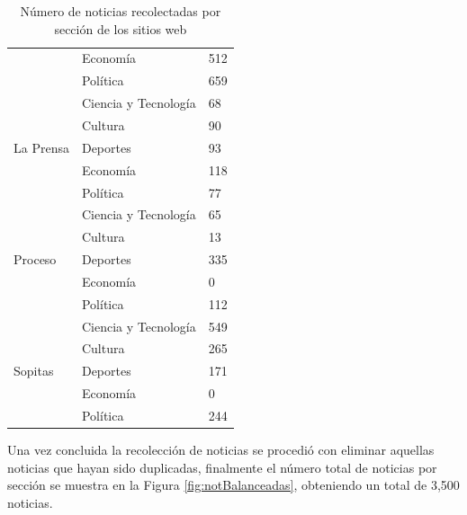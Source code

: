 \begin{table}[H]
\begin{tabular}{|l|l|l|}
                                    & Economía             & 512                \\ \cline{2-3} 
                                    & Política             & 659                \\ \hline
\multirow{5}{*}{La Prensa}          & Ciencia y Tecnología & 68                 \\ \cline{2-3} 
                                    & Cultura              & 90                 \\ \cline{2-3} 
                                    & Deportes             & 93                 \\ \cline{2-3} 
                                    & Economía             & 118                \\ \cline{2-3} 
                                    & Política             & 77                 \\ \hline
\multirow{5}{*}{Proceso}            & Ciencia y Tecnología & 65                 \\ \cline{2-3} 
                                    & Cultura              & 13                 \\ \cline{2-3} 
                                    & Deportes             & 335                \\ \cline{2-3} 
                                    & Economía             & 0                  \\ \cline{2-3} 
                                    & Política             & 112                \\ \hline
\multirow{5}{*}{Sopitas}            & Ciencia y Tecnología & 549                \\ \cline{2-3} 
                                    & Cultura              & 265                \\ \cline{2-3} 
                                    & Deportes             & 171                \\ \cline{2-3} 
                                    & Economía             & 0                  \\ \cline{2-3} 
                                    & Política             & 244                \\ \hline
\end{tabular}
\caption[Noticias recolectadas por sitio web]{Número de noticias recolectadas por sección de los sitios web}
\label{tabla:numNotic}
\end{table}

Una vez concluida la recolección de noticias se procedió con eliminar aquellas noticias que hayan sido duplicadas, finalmente el número total de noticias por sección se muestra en la Figura \ref{fig:notBalanceadas}, obteniendo un total de 3,500 noticias.\\

